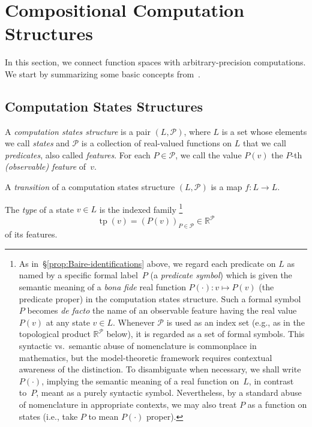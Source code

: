 
\section{Compositional Computation Structures}\label{sec:CCS}

In this section, we connect function spaces with arbitrary-precision computations.
We start by summarizing some basic concepts from~\cite{alva2024approximability}.

\subsection{Computation States Structures}
\label{sec:CSS}

A \emph{computation states structure} is a pair $(L,\mathcal{P})$, where $L$ is a set whose elements we call \emph{states} and $\mathcal{P}$ is a collection of real-valued functions on $L$ that we call \emph{predicates}, also called \emph{features}.
For each $P\in \mathcal{P}$, we call the value $P(v)$ the $P$-th \emph{(observable) feature} of~$v$.

A \emph{transition} of a computation states structure $(L,\mathcal{P})$ is a map $f\colon L\to L$.

The \emph{type} of a state $v\in L$ is the indexed family%
\footnote{As in~§\ref{prop:Baire-identifications} above, we regard each predicate on $L$ as named by a specific formal label~$P$ (a \emph{predicate symbol}) which is given the semantic meaning of a \emph{bona fide} real function $P(\cdot)\colon v\mapsto P(v)$ (the predicate proper) in the computation states structure.
Such a formal symbol~$P$ becomes \emph{de facto} the name of an observable feature having the real value $P(v)$ at any state $v\in L$.
Whenever $\mathcal{P}$ is used as an index set (e.g., as in the topological product $\mathbb{R}^{\mathcal{P}}$ below), it is regarded as a set of formal symbols.
This syntactic vs.\ semantic abuse of nomenclature is commonplace in mathematics, but the model-theoretic framework requires contextual awareness of the distinction.
To disambiguate when necessary, we shall write $P(\cdot)$, implying the semantic meaning of a real function on~$L$, in contrast to~$P$, meant as a purely syntactic symbol.
Nevertheless, by a standard abuse of nomenclature in appropriate contexts, we may also treat $P$ as a function on states (i.e., take $P$ to mean $P(\cdot)$ proper).}
\[
\operatorname{tp}(v)= (P(v))_{P\in \mathcal{P}}\in\mathbb{R}^\mathcal{P}
\]
of its features.

